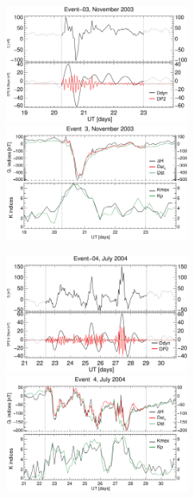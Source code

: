 \documentclass[a4paper,fleqn]{cas-dc}
\begin{document}
\begin{figure}[h!]
     \centerline{\Large \bf   
      \hspace{0.275\textwidth}  \color{black}{}
       \hspace{0.295\textwidth}  \color{black}{}
         \hfill}
    \includegraphics[width=6.0cm]{images/diono/iono_PI_V1_2003-11-19.eps} \includegraphics[width=6.0cm]{images/dH_approx/diono_valid_V4_2003-11-19.eps}            
       \centerline{\Large \bf   
      \hspace{0.275\textwidth}  \color{black}{}
       \hspace{0.295\textwidth}  \color{black}{}
         \hfill}
	\includegraphics[width=6.0cm]{images/diono/iono_PI_V1_2004-07-21.eps}     \includegraphics[width=6.0cm]{images/dH_approx/diono_valid_V4_2004-07-21.eps}      
       \centerline{\Large \bf   
      \hspace{0.275\textwidth}  \color{black}{}
       \hspace{0.295\textwidth}  \color{black}{}
}
\end{figure}
\end{document}
